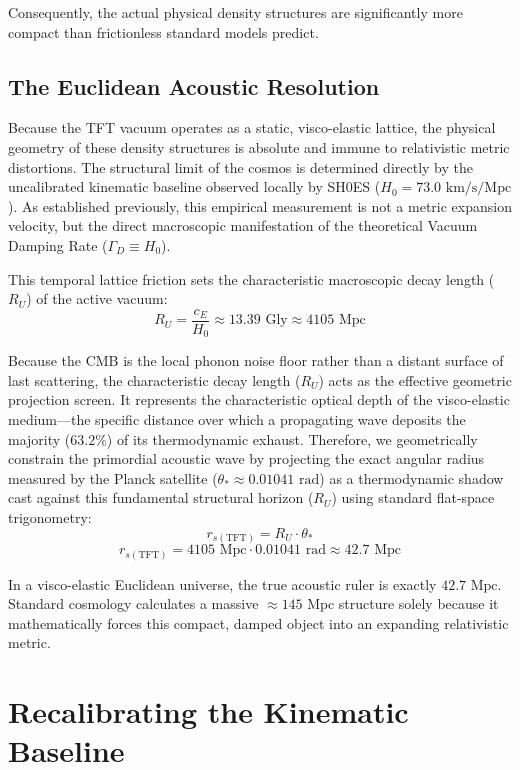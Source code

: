 Consequently, the actual physical density structures are significantly more compact than frictionless standard models predict.

\subsection{The Euclidean Acoustic Resolution}
\label{sec:euclidean_acoustic_resolution}

Because the TFT vacuum operates as a static, visco-elastic lattice, the physical geometry of these density structures is absolute and immune to relativistic metric distortions. The structural limit of the cosmos is determined directly by the uncalibrated kinematic baseline observed locally by SH0ES ($H_0 = 73.0 \text{ km/s/Mpc}$). As established previously, this empirical measurement is not a metric expansion velocity, but the direct macroscopic manifestation of the theoretical Vacuum Damping Rate ($\Gamma_D \equiv H_0$).

This temporal lattice friction sets the characteristic macroscopic decay length ($R_U$) of the active vacuum:
\[
R_U = \frac{c_E}{H_0} \approx 13.39 \text{ Gly} \approx 4105 \text{ Mpc}
\]

Because the CMB is the local phonon noise floor rather than a distant surface of last scattering, the characteristic decay length ($R_U$) acts as the effective geometric projection screen. It represents the characteristic optical depth of the visco-elastic medium---the specific distance over which a propagating wave deposits the majority ($63.2\%$) of its thermodynamic exhaust. Therefore, we geometrically constrain the primordial acoustic wave by projecting the exact angular radius measured by the Planck satellite ($\theta_* \approx 0.01041 \text{ rad}$) as a thermodynamic shadow cast against this fundamental structural horizon ($R_U$) using standard flat-space trigonometry:
\[
r_{s(\text{TFT})} = R_U \cdot \theta_*
\]
\[
r_{s(\text{TFT})} = 4105 \text{ Mpc} \cdot 0.01041 \text{ rad} \approx 42.7 \text{ Mpc}
\]

In a visco-elastic Euclidean universe, the true acoustic ruler is exactly $42.7 \text{ Mpc}$. Standard cosmology calculates a massive $\approx 145 \text{ Mpc}$ structure solely because it mathematically forces this compact, damped object into an expanding relativistic metric.

\section{Recalibrating the Kinematic Baseline}
\label{sec:recalibrating_kinematic_baseline}


